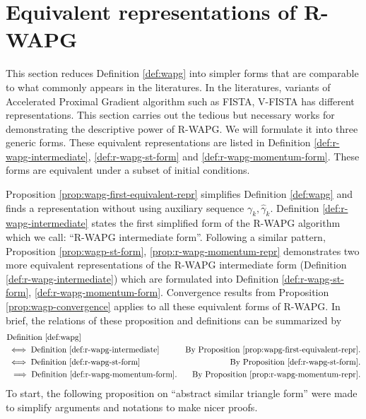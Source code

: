 \documentclass[12pt]{article}
\begin{document}
\section{Equivalent representations of R-WAPG}\label{sec:rwapg-equiv-repr}
    This section reduces Definition \ref{def:wapg} into simpler forms that are comparable to what commonly appears in the literatures. 
    In the literatures, variants of Accelerated Proximal Gradient algorithm such as FISTA, V-FISTA has different representations. 
    This section carries out the tedious but necessary works for demonstrating the descriptive power of R-WAPG. 
    We will formulate it into three generic forms. 
    These equivalent representations are listed in Definition \ref{def:r-wapg-intermediate}, \ref{def:r-wapg-st-form} and \ref{def:r-wapg-momentum-form}. 
    These forms are equivalent under a subset of initial conditions. 
    \par 
    Proposition \ref{prop:wapg-first-equivalent-repr} simplifies Definition \ref{def:wapg} and finds a representation without using auxiliary sequence $\gamma_k, \hat \gamma_k$. 
    Definition \ref{def:r-wapg-intermediate} states the first simplified form of the R-WAPG algorithm which we call: ``R-WAPG intermediate form''. 
    Following a similar pattern, Proposition \ref{prop:wagp-st-form}, \ref{prop:r-wapg-momentum-repr} demonstrates two more equivalent representations of the R-WAPG intermediate form (Definition \ref{def:r-wapg-intermediate}) which are formulated into Definition \ref{def:r-wapg-st-form}, \ref{def:r-wapg-momentum-form}. 
    Convergence results from Proposition \ref{prop:wagp-convergence} applies to all these equivalent forms of R-WAPG. 
    In brief, the relations of these proposition and definitions can be summarized by
    \begin{align*}
        & \text{Definition } \ref{def:wapg} 
        \\
        & \iff 
        \text{Definition } \ref{def:r-wapg-intermediate} & \text{By Proposition }\ref{prop:wapg-first-equivalent-repr}.
        \\
        & \iff \text{Definition }\ref{def:r-wapg-st-form} & \text{By Proposition }\ref{def:r-wapg-st-form}.
        \\
        & \;\implies 
        \text{Definition }\ref{def:r-wapg-momentum-form}. 
        & \text{By Proposition }\ref{prop:r-wapg-momentum-repr}.
    \end{align*}
    To start, the following proposition on ``abstract similar triangle form'' were made to simplify arguments and notations to make nicer proofs. 
\end{document}

